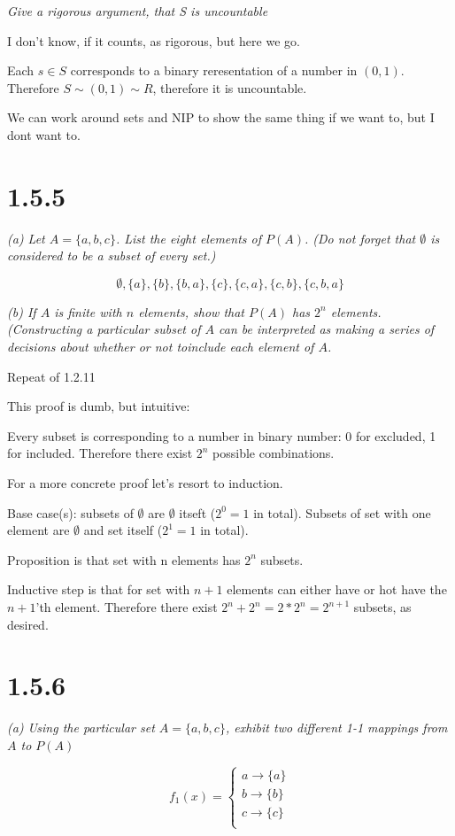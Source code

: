 \documentclass[11pt,oneside,titlepage]{article}
\begin{document}
\textit{Give a rigorous argument, that S is uncountable}

I don't know, if it counts, as rigorous, but here we go.

Each $s \in S$ corresponds to a binary reresentation of a number in $(0, 1)$. Therefore
$S \sim (0, 1) \sim R$, therefore it is uncountable.

We can work around sets and NIP to show the same thing if we want to, but I dont want to.

\section*{1.5.5}
\textit{(a) Let $A = \{a, b, c\}$. List the eight elements of $P(A)$. (Do not forget that
  $\emptyset$ is considered to be a subset of every set.)}

$$\emptyset, \{a\}, \{b\}, \{b, a\}, \{c\}, \{c, a\}, \{c, b\},  \{c, b, a\}$$

\textit{(b) If $A$ is finite with $n$ elements, show that $P(A)$ has $2^n$ elements.
  (Constructing a particular subset of $A$ can be interpreted as making a series of
  decisions about whether or not toinclude each element of $A$.}

Repeat of 1.2.11

This proof is dumb, but intuitive:

Every subset is corresponding to a number in binary number: 0 for excluded,
1 for included. Therefore there exist $2^n$ possible combinations.

For a more concrete proof let's resort to induction.

Base case(s): subsets of $\emptyset$ are $\emptyset$ itseft ($2^0 = 1$ in total). Subsets of
set with one element are $\emptyset$ and set itself ($2^1 = 1$ in total).

Proposition is that set with n elements has $2^n$ subsets.

Inductive step is that for set with $n + 1$ elements can either have or hot
have the $n + 1$'th element. Therefore there exist $2^n + 2^n = 2 * 2^n =
2^{n + 1}$ subsets, as desired.

\section*{1.5.6}
\textit{(a) Using the particular set $A = \{a, b, c\}$, exhibit two different
  1-1 mappings from $A$ to $P(A)$}

\begin{equation}
  f_1(x) =
  \begin{cases}
    a \to \{a\} \\
    b \to \{b\} \\
    c \to \{c\} \\
  \end{cases}    
\end{equation}
\end{document}
